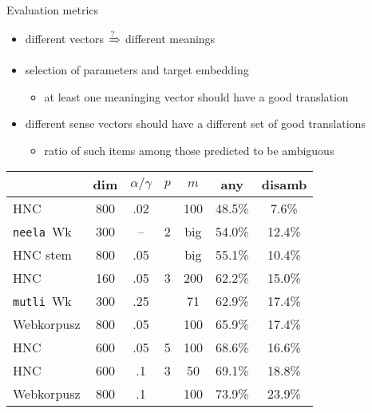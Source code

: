 \documentclass[10pt]{beamer}%
\newcommand{\bull}[1]{\begin{itemize}\item #1 \end{itemize}}
\newcommand{\neela}{\texttt{neela}}
\newcommand{\mutli}{\texttt{mutli}}
\begin{document}
\begin{frame}{Evaluation metrics}
    \begin{itemize}
      \item different vectors $ \xRightarrow ? $ different meanings
      \item selection of parameters and target embedding 
        \bull{at least one meaninging vector should have a good translation}
      \item different sense vectors should have a different set of good
        translations 
        \bull{ratio of such items among those predicted to be ambiguous}
    \end{itemize}
  \end{frame}
    \begin{frame}
      \begin{table}[allowframebreaks]
        \begin{tabular}{lcccc|cc}
          \toprule
          & dim & $\alpha/\gamma$ & $p$ & $m$ & any & disamb \\
          \midrule
          HNC	        & 800	& .02	&       & 100   & 48.5\%	&  7.6\% \\
          \neela~Wk&300&--&2   &big  & 54.0\%	&  12.4\% \\
          HNC stem & 800	& .05	&       &  big & 55.1\%	&  10.4\% \\
          HNC         & 160 & .05 & 3     & 200   & 62.2\%	&  15.0\% \\
          \mutli~Wk &300&.25 &       & 71    & 62.9\%	&  17.4\% \\
        Webkorpusz	    & 800	& .05	&       & 100	  & 65.9\%	&  17.4\% \\
        HNC	        & 600	& .05	& 5     & 100	  & 68.6\%	&  16.6\% \\
        HNC	        & 600	& .1  & 3     & 50	  & 69.1\%	&  18.8\% \\
        Webkorpusz	    & 800	& .1  &       & 100	  & 73.9\%	&  23.9\% \\
        \bottomrule
    \end{tabular}
  \end{table}
\end{frame}
\end{document}
